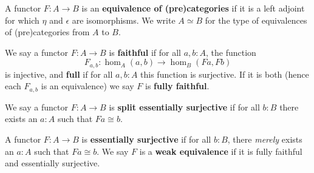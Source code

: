 \documentclass[10pt,a4paper]{article}
\providecommand{\index}[1]{}
\newcommand{\define}[1]{\textbf{#1}}
\newcommand{\cteqv}[2]{\ensuremath{#1 \simeq #2}\xspace}
\theoremstyle{definition}
\theoremstyle{remark}
\numberwithin{equation}{section}
\newcommand{\indexdef}[1]{\index{#1|defstyle}}   %
\newcommand{\indexsee}[2]{\index{#1|see{#2}}}    %
\begin{document}
\begin{defn}\label{ct:equiv}
  A functor $F:A\to B$ is an \define{equivalence of (pre)categories}
  \indexdef{equivalence!of (pre)categories}%
  \indexdef{category!equivalence of}%
  \indexdef{precategory!equivalence of}%
  \index{functor!equivalence}%
  if it is a left adjoint for which $\eta$ and $\epsilon$ are isomorphisms.
  We write $\cteqv A B$ for the type of equivalences of (pre)categories from $A$ to $B$.
\end{defn}

\begin{defn}\label{ct:full-faithful}
  We say a functor $F:A\to B$ is \define{faithful}
  \indexdef{functor!faithful}%
  \index{faithful functor}%
  if for all $a,b:A$, the function
  \[F_{a,b}:\hom_A(a,b) \to \hom_B(Fa,Fb)\]
  is injective, and \define{full}
  \indexdef{functor!full}%
  \indexdef{full functor}%
  if for all $a,b:A$ this function is surjective.
  If it is both (hence each $F_{a,b}$ is an equivalence) we say $F$ is \define{fully faithful}.
  \indexdef{functor!fully faithful}%
  \indexdef{fully faithful functor}%
\end{defn}

\begin{defn}\label{ct:split-essentially-surjective}
  We say a functor $F:A\to B$ is \define{split essentially surjective}
  \indexdef{functor!split essentially surjective}%
  \indexdef{split!essentially surjective functor}%
  if for all $b:B$ there exists an $a:A$ such that $Fa\cong b$.
\end{defn}

\begin{defn}\label{ct:essentially-surjective}
  A functor $F:A\to B$ is \define{essentially surjective}
  \indexdef{functor!essentially surjective}%
  \indexdef{essentially surjective functor}%
  if for all $b:B$, there \emph{merely} exists an $a:A$ such that $Fa\cong b$.
  We say $F$ is a \define{weak equivalence}
  \indexsee{equivalence!of (pre)categories!weak}{weak equivalence}%
  \indexdef{weak equivalence!of precategories}%
  \indexsee{functor!weak equivalence}{weak equivalence}%
  if it is fully faithful and essentially surjective.
\end{defn}
\end{document}
